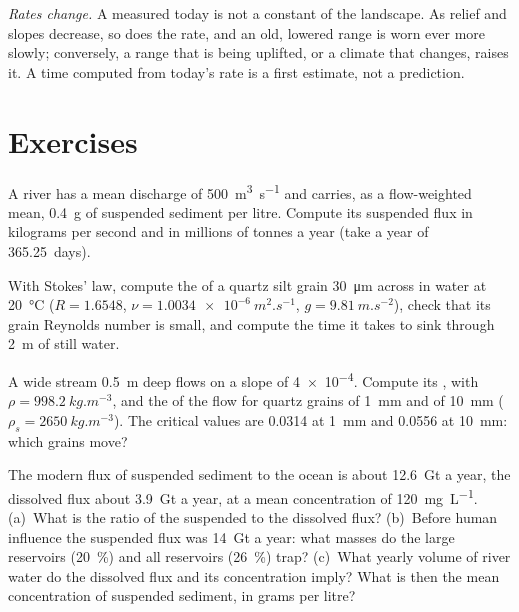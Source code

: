 \emph{Rates change.} A  measured today is not a constant of the
landscape. As relief and slopes decrease, so does the rate, and an old,
lowered range is worn ever more slowly; conversely, a range that is being
uplifted, or a climate that changes, raises it. A time computed from today's
rate is a first estimate, not a prediction.

\section{Exercises}

\begin{exercise}[$\star$]\label{exo:b1:erosion-transport:1}
A river has a mean discharge of \qty{500}{m^3.s^{-1}} and carries, as a
flow-weighted mean, \qty{0.4}{g} of suspended sediment per litre. Compute its
suspended flux in kilograms per second and in millions of tonnes a year (take a
year of \num{365.25}~days).
\end{exercise}

\begin{exercise}[$\star$]\label{exo:b1:erosion-transport:2}
With Stokes' law, compute the  of a quartz silt grain
\qty{30}{\micro m} across in water at \qty{20}{\celsius} ($R = 1.6548$, $\nu =
\qty{1.0034e-6}{m^2.s^{-1}}$, $g = \qty{9.81}{m.s^{-2}}$), check that its
grain Reynolds number is small, and compute the time it takes to sink through
\qty{2}{m} of still water.
\end{exercise}

\begin{exercise}[$\star$]\label{exo:b1:erosion-transport:3}
A wide stream \qty{0.5}{m} deep flows on a slope of \num{4e-4}. Compute its
, with $\rho = \qty{998.2}{kg.m^{-3}}$, and the  of the flow for quartz grains of \qty{1}{mm} and of \qty{10}{mm}
($\rho_s = \qty{2650}{kg.m^{-3}}$). The critical values are \num{0.0314} at
\qty{1}{mm} and \num{0.0556} at \qty{10}{mm}: which grains move?
\end{exercise}

\begin{exercise}[$\star$]\label{exo:b1:erosion-transport:4}
The modern flux of suspended sediment to the ocean is about \qty{12.6}{Gt} a
year, the dissolved flux about \qty{3.9}{Gt} a year, at a mean concentration of
\qty{120}{mg.L^{-1}}. (a)~What is the ratio of the suspended to the dissolved
flux? (b)~Before human influence the suspended flux was \qty{14}{Gt} a year:
what masses do the large reservoirs (\qty{20}{\percent}) and all reservoirs
(\qty{26}{\percent}) trap? (c)~What yearly volume of river water do the
dissolved flux and its concentration imply? What is then the mean concentration
of suspended sediment, in grams per litre?
\end{exercise}

